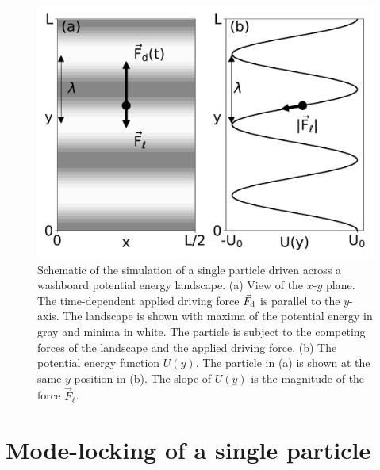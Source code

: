 \documentclass[preprint,showpacs,preprintnumbers,amsmath,amssymb,aps,prb]{revtex4-1}
\theoremstyle{remark}
\begin{document}
\begin{figure} %
\centering
\includegraphics[width=\columnwidth]{fig1_landscape.pdf}
\caption{
Schematic of the simulation of a single particle
  driven across a washboard potential energy landscape.
  (a) View of the $x$-$y$ plane. 
  The time-dependent applied driving force $\vec{F}_{\rm d}$
  is parallel to the $y$-axis.
  The landscape is shown with
  maxima of the potential energy in gray 
  and minima in white. 
  The particle is 
  subject to the competing forces of the landscape and the applied driving force.
  (b) The potential energy function $U(y)$. 
  The particle in (a) is shown at the same $y$-position in (b).
  The slope of $U(y)$ is the 
  magnitude of the force $\vec{F}_{\ell}$. 
  }
\label{fig:1_landscape}
\end{figure}

\section{Mode-locking of a single particle}
\end{document}
